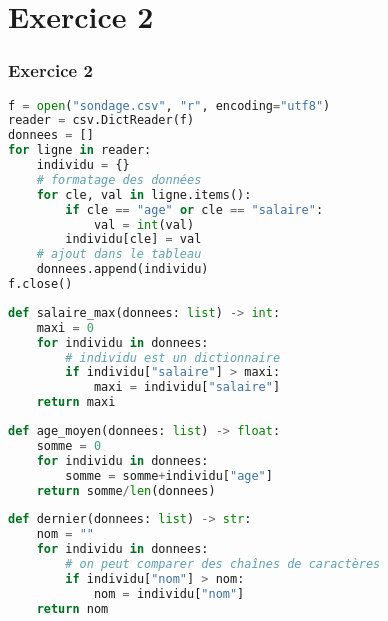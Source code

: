 \documentclass[svgnames,11pt]{beamer}
\begin{document}
\section{Exercice 2}
\begin{frame}[fragile]
    \frametitle{Exercice 2}

    \begin{center}
        \begin{lstlisting}[language=Python , basicstyle=\ttfamily\small, xleftmargin=2em, xrightmargin=2em]
f = open("sondage.csv", "r", encoding="utf8")
reader = csv.DictReader(f)
donnees = []
for ligne in reader:
    individu = {}
    # formatage des données
    for cle, val in ligne.items():
        if cle == "age" or cle == "salaire":
            val = int(val)
        individu[cle] = val
    # ajout dans le tableau
    donnees.append(individu)
f.close()
\end{lstlisting}
    \end{center}

\end{frame}
\begin{frame}[fragile]

    \begin{center}
        \begin{lstlisting}[language=Python , basicstyle=\ttfamily\small, xleftmargin=2em, xrightmargin=2em]
def salaire_max(donnees: list) -> int:
    maxi = 0
    for individu in donnees:
        # individu est un dictionnaire
        if individu["salaire"] > maxi:
            maxi = individu["salaire"]
    return maxi
\end{lstlisting}
    \end{center}

\end{frame}
\begin{frame}[fragile]

\begin{center}
    \begin{lstlisting}[language=Python , basicstyle=\ttfamily\small, xleftmargin=2em, xrightmargin=2em]
def age_moyen(donnees: list) -> float:
    somme = 0
    for individu in donnees:
        somme = somme+individu["age"]
    return somme/len(donnees)
\end{lstlisting}
\end{center}

\end{frame}
\begin{frame}[fragile]

    \begin{center}
        \begin{lstlisting}[language=Python , basicstyle=\ttfamily\small, xleftmargin=2em, xrightmargin=2em]
def dernier(donnees: list) -> str:
    nom = ""
    for individu in donnees:
        # on peut comparer des chaînes de caractères
        if individu["nom"] > nom:
            nom = individu["nom"]
    return nom
\end{lstlisting}
    \end{center}

\end{frame}
\end{document}
